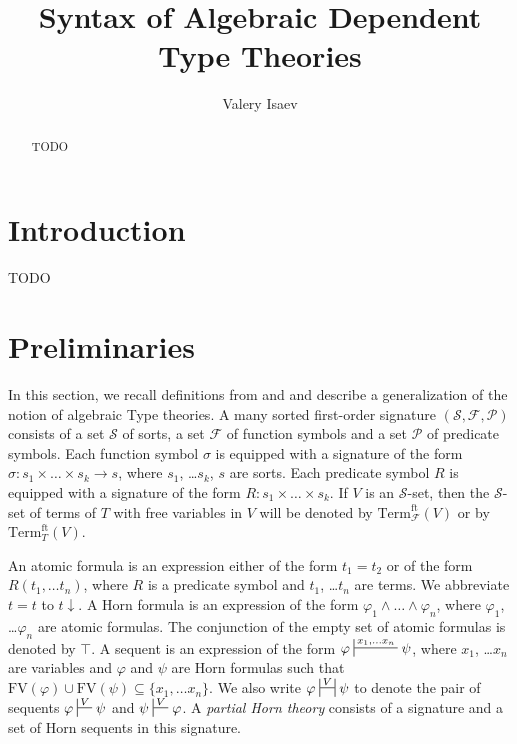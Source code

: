 \documentclass[reqno]{amsart}
\theoremstyle{definition}
\theoremstyle{remark}
\newcommand{\fs}[1]{\mathrm{#1}}
\newcommand{\Term}{\fs{Term}}
\newcommand{\FV}{\fs{FV}}
\newcommand{\ft}{\fs{ft}}
\numberwithin{figure}{section}
\begin{document}
\title{Syntax of Algebraic Dependent Type Theories}

\author{Valery Isaev}

\begin{abstract}
TODO
\end{abstract}

\maketitle

\section{Introduction}

TODO

\section{Preliminaries}

In this section, we recall definitions from \cite{PHL} and \cite{alg-tt} and describe a generalization of the notion of algebraic Type theories.
A many sorted first-order signature $(\mathcal{S},\mathcal{F},\mathcal{P})$ consists of a set $\mathcal{S}$ of sorts,
a set $\mathcal{F}$ of function symbols and a set $\mathcal{P}$ of predicate symbols.
Each function symbol $\sigma$ is equipped with a signature of the form $\sigma : s_1 \times \ldots \times s_k \to s$, where $s_1$, \ldots $s_k$, $s$ are sorts.
Each predicate symbol $R$ is equipped with a signature of the form $R : s_1 \times \ldots \times s_k$.
If $V$ is an $\mathcal{S}$-set, then the $\mathcal{S}$-set of terms of $T$ with free variables in $V$ will be denoted by $\Term^\ft_\mathcal{F}(V)$ or by $\Term^\ft_T(V)$.

An atomic formula is an expression either of the form $t_1 = t_2$ or of the form $R(t_1, \ldots t_n)$,
where $R$ is a predicate symbol and $t_1$, \ldots $t_n$ are terms.
We abbreviate $t = t$ to $t\!\downarrow$.
A Horn formula is an expression of the form $\varphi_1 \land \ldots \land \varphi_n$, where $\varphi_1$, \ldots $\varphi_n$ are atomic formulas.
The conjunction of the empty set of atomic formulas is denoted by $\top$.
A sequent is an expression of the form $\varphi \sststile{}{x_1, \ldots x_n} \psi$, where $x_1$, \ldots $x_n$ are variables
and $\varphi$ and $\psi$ are Horn formulas such that $\FV(\varphi) \cup \FV(\psi) \subseteq \{ x_1, \ldots x_n \}$.
We also write $\varphi \ssststile{}{V} \psi$ to denote the pair of sequents $\varphi \sststile{}{V} \psi$ and $\psi \sststile{}{V} \varphi$.
A \emph{partial Horn theory} consists of a signature and a set of Horn sequents in this signature.
\end{document}
